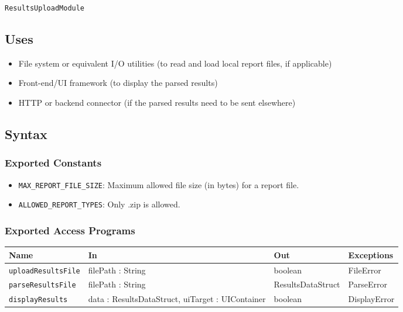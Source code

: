 \documentclass[12pt, titlepage]{article}
\begin{document}
\texttt{ResultsUploadModule}

\subsection{Uses}

\begin{itemize}
    \item File system or equivalent I/O utilities (to read and load local report files, if applicable)
    \item Front-end/UI framework (to display the parsed results)
    \item HTTP or backend connector (if the parsed results need to be sent elsewhere)
\end{itemize}

\subsection{Syntax}

\subsubsection{Exported Constants}

\begin{itemize}
    \item \texttt{MAX\_REPORT\_FILE\_SIZE}: Maximum allowed file size (in bytes) for a report file.
    \item \texttt{ALLOWED\_REPORT\_TYPES}: Only .zip is allowed.
\end{itemize}

\subsubsection{Exported Access Programs}

\begin{center}
\begin{tabular}{p{5cm} p{3.5cm} p{3.5cm} p{2cm}}
\hline
\textbf{Name} & \textbf{In} & \textbf{Out} & \textbf{Exceptions} \\
\hline
\texttt{uploadResultsFile} & filePath : String & boolean & FileError \\
\texttt{parseResultsFile} & filePath : String & ResultsDataStruct & ParseError \\
\texttt{displayResults} & data : ResultsDataStruct, uiTarget : UIContainer & boolean & DisplayError \\
\hline
\end{tabular}
\end{center}
\end{document}
